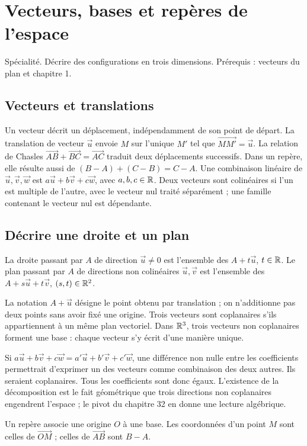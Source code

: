 \documentclass[../cours_tle.tex]{subfiles}
\begin{document}
\setcounter{chapter}{4}
\chapter{Vecteurs, bases et repères de l’espace}
\label{ch:5}
\begin{objectif}
Spécialité. Décrire des configurations en trois dimensions. Prérequis : vecteurs du plan et chapitre 1.
\end{objectif}
\section{Vecteurs et translations}
Un vecteur décrit un déplacement, indépendamment de son point de départ. La translation de vecteur $\vec u$ envoie $M$ sur l'unique $M'$ tel que $\overrightarrow{MM'}=\vec u$.
La relation de Chasles $\overrightarrow{AB}+\overrightarrow{BC}=\overrightarrow{AC}$ traduit deux déplacements successifs. Dans un repère, elle résulte aussi de $(B-A)+(C-B)=C-A$.
Une combinaison linéaire de $\vec u,\vec v,\vec w$ est $a\vec u+b\vec v+c\vec w$, avec $a,b,c\in\mathbb{R}$.
Deux vecteurs sont colinéaires si l'un est multiple de l'autre, avec le vecteur nul traité séparément ; une famille contenant le vecteur nul est dépendante.
\section{Décrire une droite et un plan}
\begin{definition}
La droite passant par $A$ de direction $\vec u\ne0$ est l'ensemble des $A+t\vec u$, $t\in\mathbb{R}$.
Le plan passant par $A$ de directions non colinéaires $\vec u,\vec v$ est l'ensemble des $A+s\vec u+t\vec v$, $(s,t)\in\mathbb{R}^2$.
\end{definition}
La notation $A+\vec u$ désigne le point obtenu par translation ; on n'additionne pas deux points sans avoir fixé une origine.
Trois vecteurs sont coplanaires s'ils appartiennent à un même plan vectoriel. Dans $\mathbb{R}^3$, trois vecteurs non coplanaires forment une base : chaque vecteur s'y écrit d'une manière unique.
\begin{demonstration}
Si $a\vec u+b\vec v+c\vec w=a'\vec u+b'\vec v+c'\vec w$, une différence non nulle entre les coefficients permettrait d'exprimer un des vecteurs comme combinaison des deux autres. Ils seraient coplanaires. Tous les coefficients sont donc égaux.
L'existence de la décomposition est le fait géométrique que trois directions non coplanaires engendrent l'espace ; le pivot du chapitre 32 en donne une lecture algébrique.
\end{demonstration}
Un repère associe une origine $O$ à une base. Les coordonnées d'un point $M$ sont celles de $\overrightarrow{OM}$ ; celles de $\overrightarrow{AB}$ sont $B-A$.
\end{document}
